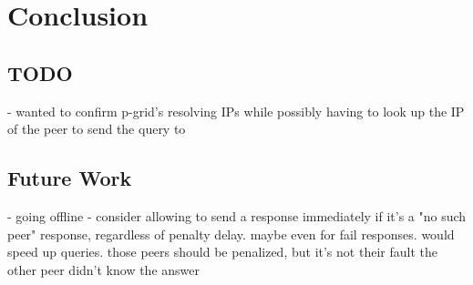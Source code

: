 \chapter{Conclusion}
\label{chap:conclusion}
\section{TODO}
- wanted to confirm p-grid's resolving IPs while possibly having to look up the
  IP of the peer to send the query to
\section{Future Work}
- going offline
- consider allowing to send a response immediately if it's a "no such peer"
  response, regardless of penalty delay. maybe even for fail responses. would
  speed up queries. those peers should be penalized, but it's not their fault
  the other peer didn't know the answer
